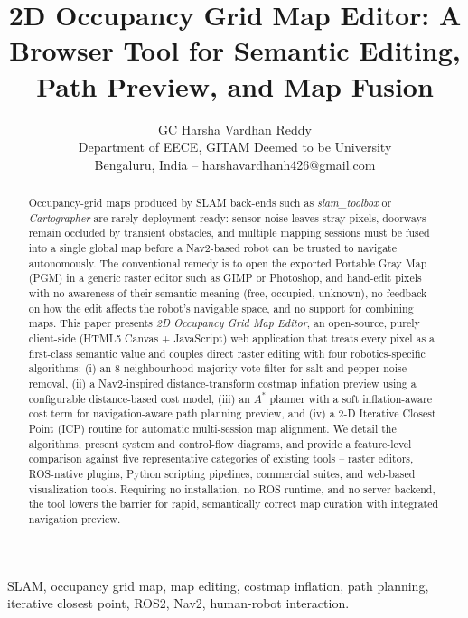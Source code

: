 \documentclass[journal]{IEEEtran}
\begin{document}
\title{\LARGE 2D Occupancy Grid Map Editor: A Browser Tool for Semantic Editing, Path Preview, and Map Fusion}

\author{GC Harsha Vardhan Reddy\\
Department of EECE, GITAM Deemed to be University\\
Bengaluru, India -- harshavardhanh426@gmail.com}

\pagestyle{empty}
\thispagestyle{empty}
\maketitle
\begin{strip}
\begin{abstract}
Occupancy-grid maps produced by SLAM back-ends such as \emph{slam\_toolbox} or \emph{Cartographer} are rarely deployment-ready: sensor noise leaves stray pixels, doorways remain occluded by transient obstacles, and multiple mapping sessions must be fused into a single global map before a Nav2-based robot can be trusted to navigate autonomously. The conventional remedy is to open the exported Portable Gray Map (PGM) in a generic raster editor such as GIMP or Photoshop, and hand-edit pixels with no awareness of their semantic meaning (free, occupied, unknown), no feedback on how the edit affects the robot's navigable space, and no support for combining maps. This paper presents \emph{2D Occupancy Grid Map Editor}, an open-source, purely client-side (HTML5 Canvas + JavaScript) web application that treats every pixel as a first-class semantic value and couples direct raster editing with four robotics-specific algorithms: (i) an 8-neighbourhood majority-vote filter for salt-and-pepper noise removal, (ii) a Nav2-inspired distance-transform costmap inflation preview using a configurable distance-based cost model, (iii) an $A^{*}$ planner with a soft inflation-aware cost term for navigation-aware path planning preview, and (iv) a 2-D Iterative Closest Point (ICP) routine for automatic multi-session map alignment. We detail the algorithms, present system and control-flow diagrams, and provide a feature-level comparison against five representative categories of existing tools -- raster editors, ROS-native plugins, Python scripting pipelines, commercial suites, and web-based visualization tools. Requiring no installation, no ROS runtime, and no server backend, the tool lowers the barrier for rapid, semantically correct map curation with integrated navigation preview.
\end{abstract}

\begin{IEEEkeywords}
SLAM, occupancy grid map, map editing, costmap inflation, path planning, iterative closest point, ROS2, Nav2, human-robot interaction.
\end{IEEEkeywords}
\end{strip}
\end{document}
